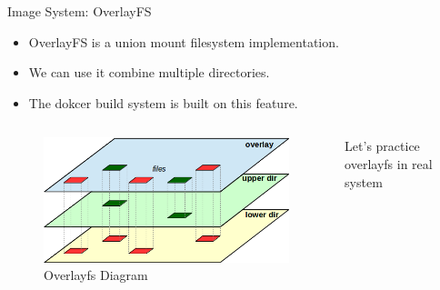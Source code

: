\begin{frame}{Image System:  OverlayFS}
    \begin{itemize}
        \item OverlayFS is a union mount filesystem implementation.
        \pause
        \item We can use it combine multiple directories.
        \pause
        \item The dokcer build system is built on this feature.
    \end{itemize}

    \begin{columns}
        \begin{column}{0.7\textwidth}
            \begin{figure}
                \includegraphics[width=1\textwidth]{assets/overlayfs.png}
                \caption{Overlayfs Diagram}
            \end{figure}
        \end{column}
        \begin{column}{0.3\textwidth}
            Let's practice overlayfs in real system
        \end{column}
    \end{columns}
\end{frame}